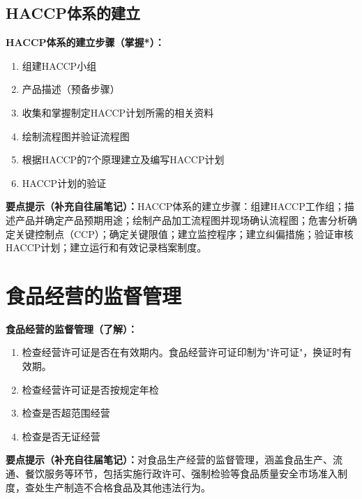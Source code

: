 \subsection{HACCP体系的建立}

\begin{keybox}
\textbf{HACCP体系的建立步骤（掌握*）：}
\begin{enumerate}[leftmargin=*]
    \item 组建HACCP小组
    \item 产品描述（预备步骤）
    \item 收集和掌握制定HACCP计划所需的相关资料
    \item 绘制流程图并验证流程图
    \item 根据HACCP的7个原理建立及编写HACCP计划
    \item HACCP计划的验证
\end{enumerate}
\end{keybox}

\begin{tipbox}
\textbf{要点提示（补充自往届笔记）：}HACCP体系的建立步骤：组建HACCP工作组；描述产品并确定产品预期用途；绘制产品加工流程图并现场确认流程图；危害分析确定关键控制点（CCP）；确定关键限值；建立监控程序；建立纠偏措施；验证审核HACCP计划；建立运行和有效记录档案制度。
\end{tipbox}

\section{食品经营的监督管理}

\begin{defbox}
\textbf{食品经营的监督管理（了解）：}
\begin{enumerate}[leftmargin=*]
    \item 检查经营许可证是否在有效期内。食品经营许可证印制为"许可证"，换证时有效期。
    \item 检查经营许可证是否按规定年检
    \item 检查是否超范围经营
    \item 检查是否无证经营
\end{enumerate}
\end{defbox}

\begin{tipbox}
\textbf{要点提示（补充自往届笔记）：}对食品生产经营的监督管理，涵盖食品生产、流通、餐饮服务等环节，包括实施行政许可、强制检验等食品质量安全市场准入制度，查处生产制造不合格食品及其他违法行为。
\end{tipbox}

